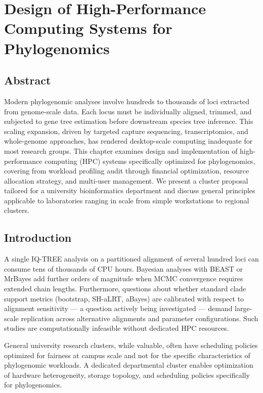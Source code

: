 \chapter{Design of High-Performance Computing Systems for Phylogenomics}

\section*{Abstract}

Modern phylogenomic analyses involve hundreds to thousands of loci extracted from genome-scale data. Each locus must be individually aligned, trimmed, and subjected to gene tree estimation before downstream species tree inference. This scaling expansion, driven by targeted capture sequencing, transcriptomics, and whole-genome approaches, has rendered desktop-scale computing inadequate for most research groups. This chapter examines design and implementation of high-performance computing (HPC) systems specifically optimized for phylogenomics, covering from workload profiling audit through financial optimization, resource allocation strategy, and multi-user management. We present a cluster proposal tailored for a university bioinformatics department and discuss general principles applicable to laboratories ranging in scale from simple workstations to regional clusters.

\section{Introduction}

A single IQ-TREE analysis on a partitioned alignment of several hundred loci can consume tens of thousands of CPU hours. Bayesian analyses with BEAST or MrBayes add further orders of magnitude when MCMC convergence requires extended chain lengths. Furthermore, questions about whether standard clade support metrics (bootstrap, SH-aLRT, aBayes) are calibrated with respect to alignment sensitivity --- a question actively being investigated --- demand large-scale replication across alternative alignments and parameter configurations. Such studies are computationally infeasible without dedicated HPC resources.

General university research clusters, while valuable, often have scheduling policies optimized for fairness at campus scale and not for the specific characteristics of phylogenomic workloads. A dedicated departmental cluster enables optimization of hardware heterogeneity, storage topology, and scheduling policies specifically for phylogenomics.

